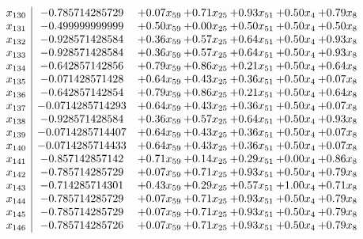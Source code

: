 \documentclass[8pt]{article}
\begin{document}
\[\begin{array}{c| c c@{\hskip 2pt} c@{\hskip 2pt} c@{\hskip 2pt} c@{\hskip 2pt} c@{\hskip 2pt} }
 x_{130}   &  -0.785714285729 & +  0.07 x_{59} & +  0.71 x_{25} & +  0.93 x_{51} & +  0.50 x_{4} & +  0.79 x_{8}\\
 x_{131}   &  -0.499999999999 & +  0.50 x_{59} & +  0.00 x_{25} & +  0.50 x_{51} & +  0.50 x_{4} & +  0.50 x_{8}\\
 x_{132}   &  -0.928571428584 & +  0.36 x_{59} & +  0.57 x_{25} & +  0.64 x_{51} & +  0.50 x_{4} & +  0.93 x_{8}\\
 x_{133}   &  -0.928571428584 & +  0.36 x_{59} & +  0.57 x_{25} & +  0.64 x_{51} & +  0.50 x_{4} & +  0.93 x_{8}\\
 x_{134}   &  -0.642857142856 & +  0.79 x_{59} & +  0.86 x_{25} & +  0.21 x_{51} & +  0.50 x_{4} & +  0.64 x_{8}\\
 x_{135}   &  -0.071428571428 & +  0.64 x_{59} & +  0.43 x_{25} & +  0.36 x_{51} & +  0.50 x_{4} & +  0.07 x_{8}\\
 x_{136}   &  -0.642857142854 & +  0.79 x_{59} & +  0.86 x_{25} & +  0.21 x_{51} & +  0.50 x_{4} & +  0.64 x_{8}\\
 x_{137}   &  -0.0714285714293 & +  0.64 x_{59} & +  0.43 x_{25} & +  0.36 x_{51} & +  0.50 x_{4} & +  0.07 x_{8}\\
 x_{138}   &  -0.928571428584 & +  0.36 x_{59} & +  0.57 x_{25} & +  0.64 x_{51} & +  0.50 x_{4} & +  0.93 x_{8}\\
 x_{139}   &  -0.0714285714407 & +  0.64 x_{59} & +  0.43 x_{25} & +  0.36 x_{51} & +  0.50 x_{4} & +  0.07 x_{8}\\
 x_{140}   &  -0.0714285714433 & +  0.64 x_{59} & +  0.43 x_{25} & +  0.36 x_{51} & +  0.50 x_{4} & +  0.07 x_{8}\\
 x_{141}   &  -0.857142857142 & +  0.71 x_{59} & +  0.14 x_{25} & +  0.29 x_{51} & +  0.00 x_{4} & +  0.86 x_{8}\\
 x_{142}   &  -0.785714285729 & +  0.07 x_{59} & +  0.71 x_{25} & +  0.93 x_{51} & +  0.50 x_{4} & +  0.79 x_{8}\\
 x_{143}   &  -0.714285714301 & +  0.43 x_{59} & +  0.29 x_{25} & +  0.57 x_{51} & +  1.00 x_{4} & +  0.71 x_{8}\\
 x_{144}   &  -0.785714285729 & +  0.07 x_{59} & +  0.71 x_{25} & +  0.93 x_{51} & +  0.50 x_{4} & +  0.79 x_{8}\\
 x_{145}   &  -0.785714285729 & +  0.07 x_{59} & +  0.71 x_{25} & +  0.93 x_{51} & +  0.50 x_{4} & +  0.79 x_{8}\\
 x_{146}   &  -0.785714285726 & +  0.07 x_{59} & +  0.71 x_{25} & +  0.93 x_{51} & +  0.50 x_{4} & +  0.79 x_{8}\\

\end{array}\]
\end{document}
